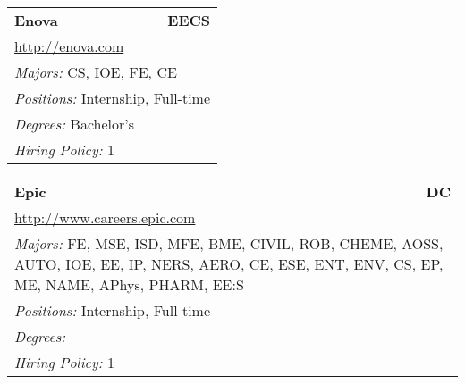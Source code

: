\documentclass[twoside]{article}
\begin{document}
\begin{center}
\begin{multicols}{3}
\begin{FlushLeft}
\begin{minipage}{\columnwidth}
\end{minipage}
 
\begin{minipage}{\columnwidth}\begin{tabularx}{.95\columnwidth}{Xr}
                 {\Large\bf Enova} & {\Large\bf EECS}\\
    \multicolumn{2}{p{.95\columnwidth}}{\url{http://enova.com}}\\
    \multicolumn{2}{p{.95\columnwidth}}{\emph{Majors:} CS, IOE, FE, CE}\\
    \multicolumn{2}{p{.95\columnwidth}}{\emph{Positions:} Internship, Full-time}\\
    \multicolumn{2}{p{.95\columnwidth}}{\emph{Degrees:} Bachelor's}\\
    \multicolumn{2}{p{.95\columnwidth}}{\emph{Hiring Policy:} 1}\\
    \end{tabularx}
    
\end{minipage}
 
\begin{minipage}{\columnwidth}\begin{tabularx}{.95\columnwidth}{Xr}
                 {\Large\bf Epic} & {\Large\bf DC}\\
    \multicolumn{2}{p{.95\columnwidth}}{\url{http://www.careers.epic.com}}\\
    \multicolumn{2}{p{.95\columnwidth}}{\emph{Majors:} FE, MSE, ISD, MFE, BME, CIVIL, ROB, CHEME, AOSS, AUTO, IOE, EE, IP, NERS, AERO, CE, ESE, ENT, ENV, CS, EP, ME, NAME, APhys, PHARM, EE:S}\\
    \multicolumn{2}{p{.95\columnwidth}}{\emph{Positions:} Internship, Full-time}\\
    \multicolumn{2}{p{.95\columnwidth}}{\emph{Degrees:} }\\
    \multicolumn{2}{p{.95\columnwidth}}{\emph{Hiring Policy:} 1}\\
    \end{tabularx}
    
\end{minipage}
 

\end{FlushLeft}
\end{multicols}
\end{center}
\end{document}
